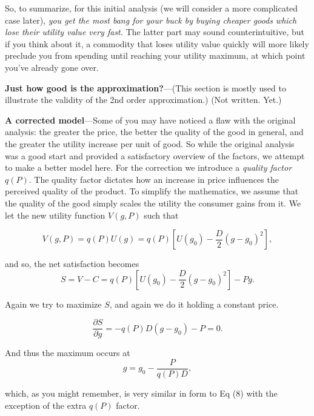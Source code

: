 \documentclass[11pt]{article}
\begin{document}
So, to summarize, for this initial analysis (we will consider a more complicated case later), \textit{you get the most bang for your buck by buying cheaper goods which lose their utility value very fast.} The latter part may sound counterintuitive, but if you think about it, a commodity that loses utility value quickly will more likely preclude you from spending until reaching your utility maximum, at which point you've already gone over.

\vspace{16pt}
\textbf{Just how good is the approximation?}---(This section is mostly used to illustrate the validity of the 2nd order approximation.) (Not written. Yet.)

\vspace{16pt}
\textbf{A corrected model}---Some of you may have noticed a flaw with the original analysis: the greater the price, the better the quality of the good in general, and the greater the utility increase per unit of good. So while the original analysis was a good start and provided a satisfactory overview of the factors, we attempt to make a better model here. For the correction we introduce a \textit{quality factor} $q(P)$. The quality factor dictates how an increase in price influences the perceived quality of the product. 
To simplify the mathematics, we assume that the quality of the good simply scales the utility the consumer gains from it. We let the new utility function $V(g,P)$ such that

\begin{equation}
	V(g,P) = q(P)U(g) = q(P)\left[U(g_0) - \frac{D}{2}(g-g_0)^2\right],
\end{equation}

and so, the net satisfaction becomes
\begin{equation}
	S = V - C = q(P)\left[U(g_0) - \frac{D}{2}(g-g_0)^2\right] - Pg.
\end{equation}

Again we try to maximize $S$, and again we do it holding a constant price.

\begin{equation}
	\frac{\partial S}{\partial g} = -q(P)D(g-g_0) - P = 0.
\end{equation}

And thus the maximum occurs at
\begin{equation}
	g = g_0 - \frac{P}{q(P)D},
\end{equation}

which, as you might remember, is very similar in form to Eq (8) with the exception of the extra $q(P)$ factor.
\end{document}
